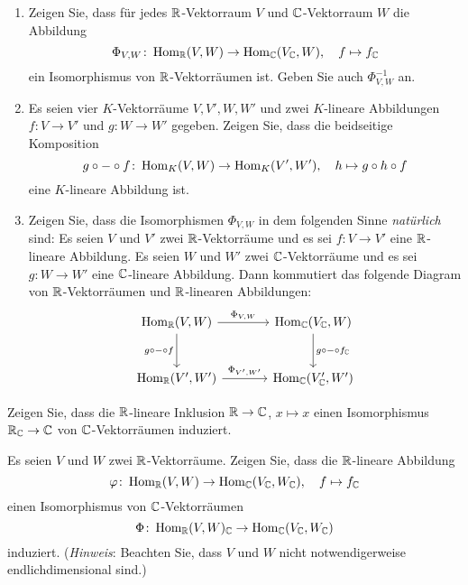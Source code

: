 \documentclass[a4paper,10pt]{scrartcl}
\begin{document}
\begin{question}
  \begin{enumerate}[leftmargin=*]
    \item
      Zeigen Sie, dass für jedes $\mathbb{R}$-Vektorraum $V$ und $\mathbb{C}$-Vektorraum $W$ die Abbildung
      \[
        \Phi_{V,W} \colon \operatorname{Hom}_{\mathbb{R}}(V, W) \to \operatorname{Hom}_{\mathbb{C}}(V_{\mathbb{C}}, W),
        \quad
        f \mapsto f_{\mathbb{C}}
      \]
      ein Isomorphismus von $\mathbb{R}$-Vektorräumen ist.
      Geben Sie auch $\Phi_{V,W}^{-1}$ an.
    \item
      Es seien vier $K$-Vektorräume $V, V', W, W'$ und zwei $K$-lineare Abbildungen $f \colon V \to V'$ und $g \colon W \to W'$ gegeben.
      Zeigen Sie, dass die beidseitige Komposition
      \[
        g \circ - \circ f
        \colon
        \operatorname{Hom}_K(V, W) \to \operatorname{Hom}_K(V', W'),
        \quad
        h \mapsto g \circ h \circ f
      \]
      eine $K$-lineare Abbildung ist.
    \item
      Zeigen Sie, dass die Isomorphismen $\Phi_{V,W}$ in dem folgenden Sinne \emph{natürlich} sind:
      Es seien $V$ und $V'$ zwei $\mathbb{R}$-Vektorräume und es sei $f \colon V \to V'$ eine $\mathbb{R}$-lineare Abbildung.
      Es seien $W$ und $W'$ zwei $\mathbb{C}$-Vektorräume und es sei $g \colon W \to W'$ eine $\mathbb{C}$-lineare Abbildung.
      Dann kommutiert das folgende Diagram von $\mathbb{R}$-Vektorräumen und $\mathbb{R}$-linearen Abbildungen:
      \[
        \begin{tikzcd}[row sep = large, column sep = large, ampersand replacement=\&]
                \Hom_\Rbb(V, W)         \arrow[swap]{d}{g \circ - \circ f}
                                        \arrow{r}{\Phi_{V,W}}
            \&  \Hom_\Cbb(V_\Cbb, W)    \arrow{d}{g \circ - \circ f_\Cbb}
          \\
                \Hom_\Rbb(V', W')       \arrow{r}{\Phi_{V',W'}}
            \&  \Hom_\Cbb(V'_\Cbb, W')
        \end{tikzcd}
      \]

  \end{enumerate}
\end{question}



\begin{question}
  Zeigen Sie, dass die $\mathbb{R}$-lineare Inklusion $\mathbb{R} \to \mathbb{C}$, $x \mapsto x$ einen Isomorphismus $\mathbb{R}_{\mathbb{C}} \to \mathbb{C}$ von $\mathbb{C}$-Vektorräumen induziert.
\end{question}


\begin{question}
  Es seien $V$ und $W$ zwei $\mathbb{R}$-Vektorräume.
  Zeigen Sie, dass die $\mathbb{R}$-lineare Abbildung
  \[
    \varphi \colon \operatorname{Hom}_{\mathbb{R}}(V, W) \to \operatorname{Hom}_{\mathbb{C}}(V_{\mathbb{C}}, W_{\mathbb{C}}),
    \quad
    f \mapsto f_{\mathbb{C}}
  \]
  einen Isomorphismus von $\mathbb{C}$-Vektorräumen
  \[
    \Phi \colon \operatorname{Hom}_{\mathbb{R}}(V, W)_{\mathbb{C}} \to \operatorname{Hom}_{\mathbb{C}}(V_{\mathbb{C}}, W_{\mathbb{C}})
  \]
  induziert.
  (\emph{Hinweis}: Beachten Sie, dass $V$ und $W$ nicht notwendigerweise endlichdimensional sind.)
\end{question}
\end{document}
